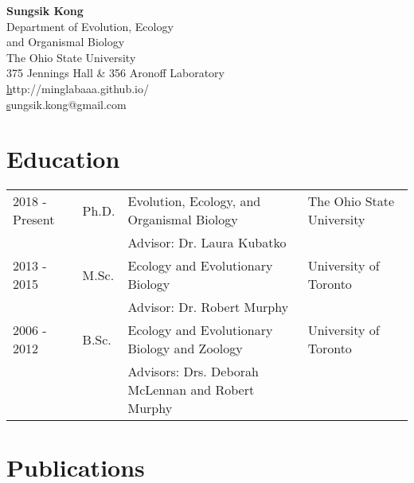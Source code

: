 \documentclass[11pt]{article}
\begin{document}
\pagestyle{plain}

\begin{center}
\huge \textbf{Sungsik Kong}\\
\large Department of Evolution, Ecology \\
and Organismal Biology\\
\large The Ohio State University\\
\large 375 Jennings Hall \& 356 Aronoff Laboratory\\
\small \href{http://minglabaaa.github.io}http://minglabaaa.github.io/\\
\small \href{mailto:sungsik.kong@gmail.com}sungsik.kong@gmail.com
\end{center}

\section*{Education}

\begin{longtable}{p{}  p{} p{} p{}}
2018 - Present & Ph.D. & Evolution, Ecology, and Organismal Biology & The Ohio State University\\
 & & Advisor: Dr. Laura Kubatko\\
2013 - 2015 & {M.Sc.} & Ecology and Evolutionary Biology & University of Toronto\\
 & & Advisor: Dr. Robert Murphy\\
2006 - 2012 & {B.Sc.} & Ecology and Evolutionary Biology and Zoology & University of Toronto\\
 & & Advisors: Drs. Deborah McLennan and Robert Murphy
\end{longtable}

\hspace{0pt}

\section*{Publications}
\end{document}
